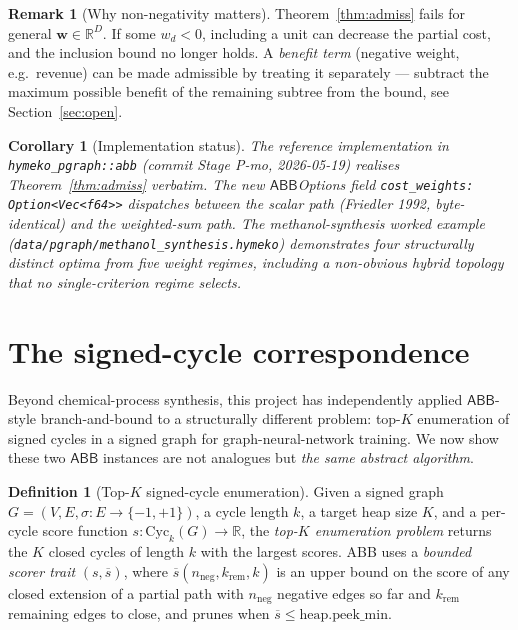 \documentclass[11pt,a4paper]{article}
\theoremstyle{plain}
\newtheorem{corollary}[theorem]{Corollary}
\theoremstyle{definition}
\newtheorem{definition}[theorem]{Definition}
\newtheorem{remark}[theorem]{Remark}
\newcommand{\code}[1]{\texttt{\small #1}}
\newcommand{\abb}{\textsf{ABB}}
\newcommand{\Real}{\mathbb{R}}
\newcommand{\bw}{\boldsymbol{w}}
\begin{document}
\begin{remark}[Why non-negativity matters]
Theorem~\ref{thm:admiss} fails for general $\bw \in \Real^D$. If
some $w_d < 0$, including a unit can decrease the partial cost,
and the inclusion bound no longer holds. A \emph{benefit term}
(negative weight, e.g.\ revenue) can be made admissible by
treating it separately --- subtract the maximum possible benefit
of the remaining subtree from the bound, see Section~\ref{sec:open}.
\end{remark}

\begin{corollary}[Implementation status]
\label{cor:impl}
The reference implementation in
\code{hymeko\_pgraph::abb} (commit Stage P-mo, 2026-05-19)
realises Theorem~\ref{thm:admiss} verbatim. The new
$\abb$Options field
\code{cost\_weights: Option<Vec<f64>>} dispatches between the
scalar path (Friedler 1992, byte-identical) and the
weighted-sum path. The methanol-synthesis worked example
(\code{data/pgraph/methanol\_synthesis.hymeko}) demonstrates
four structurally distinct optima from five weight regimes,
including a non-obvious hybrid topology that no single-criterion
regime selects.
\end{corollary}

\section{The signed-cycle correspondence}
\label{sec:cycle-corr}

Beyond chemical-process synthesis, this project has independently
applied $\abb$-style branch-and-bound to a structurally different
problem: top-$K$ enumeration of signed cycles in a signed graph
for graph-neural-network training. We now show these two
$\abb$ instances are not analogues but \emph{the same abstract algorithm}.

\begin{definition}[Top-$K$ signed-cycle enumeration]
\label{def:cycle-abb}
Given a signed graph $G = (V, E, \sigma : E \to \{-1, +1\})$, a
cycle length $k$, a target heap size $K$, and a per-cycle score
function $s : \mathrm{Cyc}_k(G) \to \Real$, the
\emph{top-$K$ enumeration problem} returns the $K$ closed
cycles of length $k$ with the largest scores. ABB uses a
\emph{bounded scorer trait} $(s, \overline{s})$, where
$\overline{s}(n_{\text{neg}}, k_{\text{rem}}, k)$ is an upper bound
on the score of any closed extension of a partial path with
$n_{\text{neg}}$ negative edges so far and $k_{\text{rem}}$
remaining edges to close, and prunes when
$\overline{s} \leq \mathrm{heap.peek\_min}$.
\end{definition}
\end{document}
